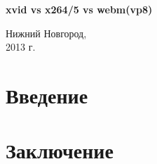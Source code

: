 \documentclass[12pt, a4paper, utf8]{extarticle}
\begin{document}
\begin{titlepage}
\begin{center}
{
    \bf \Large \textsf{ xvid vs x264/5 vs webm(vp8) }
}

\end{center}
\vspace{3em}

\vfill 
\begin{center} 
{\rm Нижний Новгород, \\ 2013 г.} 
\end {center} 
\end{titlepage} 

\tableofcontents

\newpage
\section*{Введение}

\newpage 
\newpage 

\newpage
\section*{Заключение}
\end{document}

